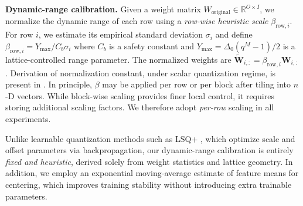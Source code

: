 \documentclass{article}
\theoremstyle{definition}
\theoremstyle{remark}
\begin{document}


\noindent \textbf{Dynamic-range calibration.}
Given a weight matrix $W_{\mathrm{original}} \in \mathbb{R}^{O \times I}$, we normalize the dynamic range of each row using a \emph{row-wise heuristic scale} $\beta_{\mathrm{row},i}$. For row $i$, we estimate its empirical standard deviation $\sigma_i$ and define $\beta_{\mathrm{row},i} = Y_{\max}/C_b \sigma_i$ where $C_b$ is a safety constant and $Y_{\max}=\Delta_0 (q^{M}-1)/2$ is a lattice-controlled range parameter.
The normalized weights are $\widetilde{\mathbf{W}}_{i,:}=\beta_{\mathrm{row},i}\mathbf{W}_{i,:}$.
Derivation of normalization constant, under scalar quantization regime, is present in \cite{banner2018aciq}. In principle, $\beta$ may be applied per row or per block after tiling into $n$-D vectors. While block-wise scaling provides finer local control, it requires storing additional scaling factors. We therefore adopt \emph{per-row} scaling in all experiments.

Unlike learnable quantization methods such as LSQ+ \cite{lsq+}, which optimize scale and offset parameters via backpropagation, our dynamic-range calibration is entirely \emph{fixed and heuristic}, derived solely from weight statistics and lattice geometry. In addition, we employ an exponential moving-average estimate of feature means for centering, which improves training stability without introducing extra trainable parameters.
\end{document}
